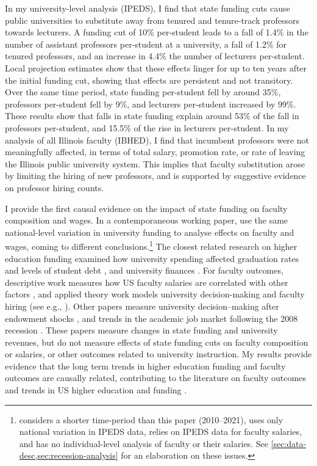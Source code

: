 In my university-level analysis (IPEDS), I find that state funding cuts cause public universities to substitute away from tenured and tenure-track professors towards lecturers.
A funding cut of 10\% per-student leads to a fall of 1.4\% in the number of assistant professors per-student at a university, a fall of 1.2\% for tenured professors, and an increase in 4.4\% the number of lecturers per-student.
Local projection estimates show that these effects linger for up to ten years after the initial funding cut, showing that effects are persistent and not transitory.
Over the same time period, state funding per-student fell by around 35\%, professors per-student fell by 9\%, and lecturers per-student increased by 99\%.
These results show that falls in state funding explain around 53\% of the fall in professors per-student,
and 15.5\% of the rise in lecturers per-student.
In my analysis of all Illinois faculty (IBHED), I find that incumbent professors were not meaningfully affected, in terms of total salary, promotion rate, or rate of leaving the Illinois public university system.
This implies that faculty substitution arose by limiting the hiring of new professors, and is supported by suggestive evidence on professor hiring counts.

I provide the first causal evidence on the impact of state funding on faculty composition and wages.
In a contemporaneous working paper, \cite{hinrichs2022state} use the same national-level variation in university funding to analyse effects on faculty and wages, coming to different conclusions.\footnote{    
    \cite{hinrichs2022state} considers a shorter time-period than this paper (2010--2021), uses only national variation in IPEDS data, relies on IPEDS data for faculty salaries, and has no individual-level analysis of faculty or their salaries.
    See \autoref{sec:data-desc,sec:recession-analysis} for an elaboration on these issues.
}
The closest related research on higher education funding examined how university spending affected graduation rates and levels of student debt \citep{NBERw23736,NBERw27885}, and university finances \citep{miller2022making,bound2019public,webber2017state}.
For faculty outcomes, descriptive work measures how US faculty salaries are correlated with other factors \citep{hilmer2020labor}, and applied theory work models university decision-making and faculty hiring (see e.g., \citealt{abe2015implications,johnson2009jep,NBERc13879}).
Other papers measure university decision--making after endowment shocks \citep{brown2014endowment}, and trends in the academic job market following the 2008 recession \citep{turner2014impact}.
These papers measure changes in state funding and university revenues, but do not measure effects of state funding cuts on faculty composition or salaries, or other outcomes related to university instruction.
My results provide evidence that the long term trends in higher education funding and faculty outcomes are causally related, contributing to the literature on faculty outcomes \citep{ehrenberg2003studying} and trends in US higher education and funding \citep{hoxby2009changing,ehrenberg2012american}.

